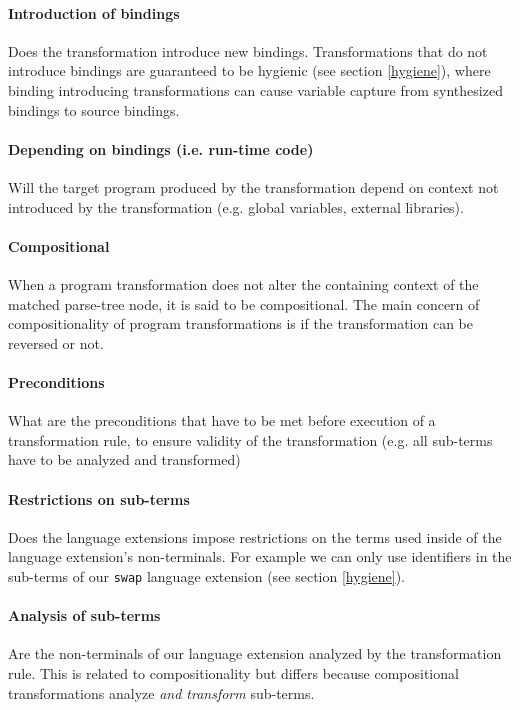\paragraph{Introduction of bindings}
Does the transformation introduce new bindings. Transformations that do not introduce bindings are guaranteed to be hygienic (see section \ref{hygiene}), where binding introducing transformations can cause variable capture from synthesized bindings to source bindings.

\paragraph{Depending on bindings (i.e. run-time code)}
Will the target program produced by the transformation depend on context not introduced by the transformation (e.g. global variables, external libraries).

\paragraph{Compositional}
When a program transformation does not alter the containing context of the matched parse-tree node, it is said to be compositional. The main concern of compositionality of program transformations is if the transformation can be reversed or not.

\paragraph{Preconditions}
What are the preconditions that have to be met before execution of a transformation rule, to ensure validity of the transformation (e.g. all sub-terms have to be analyzed and transformed)

\paragraph{Restrictions on sub-terms}
Does the language extensions impose restrictions on the terms used inside of the language extension's non-terminals. For example we can only use identifiers in the sub-terms of our \lstinline$swap$ language extension (see section \ref{hygiene}).

\paragraph{Analysis of sub-terms}
Are the non-terminals of our language extension analyzed by the transformation rule. This is related to compositionality but differs because compositional transformations analyze \textit{and transform} sub-terms.

